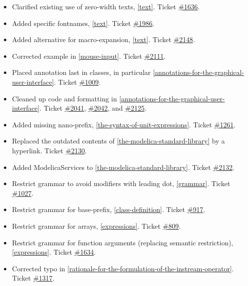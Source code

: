 \begin{itemize}
\item
  Clarified existing use of zero-width texts, \ref{text}. Ticket
  \href{https://trac.modelica.org/Modelica/ticket/1636}{\#1636}.
\item
  Added specific fontnames, \ref{text}. Ticket
  \href{https://trac.modelica.org/Modelica/ticket/1986}{\#1986}.
\item
  Added alternative for macro-expansion, \ref{text}. Ticket
  \href{https://trac.modelica.org/Modelica/ticket/2148}{\#2148}.
\item
  Corrected example in \ref{mouse-input}. Ticket
  \href{https://trac.modelica.org/Modelica/ticket/2111}{\#2111}.
\item
  Placed annotation last in classes, in particular \ref{annotations-for-the-graphical-user-interface}. Ticket
  \href{https://trac.modelica.org/Modelica/ticket/1009}{\#1009}.
\item
  Cleaned up code and formatting in \ref{annotations-for-the-graphical-user-interface}. Ticket
  \href{https://trac.modelica.org/Modelica/ticket/2041}{\#2041},
  \href{https://trac.modelica.org/Modelica/ticket/2042}{\#2042}, and
  \href{https://trac.modelica.org/Modelica/ticket/2125}{\#2125}.
\item
  Added missing nano-prefix, \ref{the-syntax-of-unit-expressions}. Ticket
  \href{https://trac.modelica.org/Modelica/ticket/1261}{\#1261}.
\item
  Replaced the outdated contents of \ref{the-modelica-standard-library} by a hyperlink. Ticket
  \href{https://trac.modelica.org/Modelica/ticket/2130}{\#2130}.
\item
  Added ModelicaServices to \ref{the-modelica-standard-library}. Ticket
  \href{https://trac.modelica.org/Modelica/ticket/2132}{\#2132}.
\item
  Restrict grammar to avoid modifiers with leading dot, \ref{grammar}.
  Ticket \href{https://trac.modelica.org/Modelica/ticket/1027}{\#1027}.
\item
  Restrict grammar for base-prefix, \ref{class-definition}. Ticket
  \href{https://trac.modelica.org/Modelica/ticket/917}{\#917}.
\item
  Restrict grammar for arrays, \ref{expressions}. Ticket
  \href{https://trac.modelica.org/Modelica/ticket/809}{\#809}.
\item
  Restrict grammar for function arguments (replacing semantic
  restriction), \ref{expressions}. Ticket
  \href{https://trac.modelica.org/Modelica/ticket/1634}{\#1634}.
\item
  Corrected typo in \ref{rationale-for-the-formulation-of-the-instream-operator}. Ticket
  \href{https://trac.modelica.org/Modelica/ticket/1317}{\#1317}.
\end{itemize}

